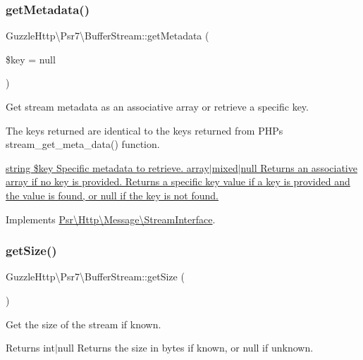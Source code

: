 \subsubsection{\texorpdfstring{get\+Metadata()}{getMetadata()}}
{\footnotesize\ttfamily Guzzle\+Http\textbackslash{}\+Psr7\textbackslash{}\+Buffer\+Stream\+::get\+Metadata (\begin{DoxyParamCaption}\item[{}]{\$key = {\ttfamily null} }\end{DoxyParamCaption})}

Get stream metadata as an associative array or retrieve a specific key.

The keys returned are identical to the keys returned from P\+HP\textquotesingle{}s stream\+\_\+get\+\_\+meta\+\_\+data() function.

\hyperlink{}{string \$key Specific metadata to retrieve.  array$\vert$mixed$\vert$null Returns an associative array if no key is provided. Returns a specific key value if a key is provided and the value is found, or null if the key is not found. }

Implements \hyperlink{interfacePsr_1_1Http_1_1Message_1_1StreamInterface_ac5e77fbbc7ba4235a4041d966f3aaa84}{Psr\textbackslash{}\+Http\textbackslash{}\+Message\textbackslash{}\+Stream\+Interface}.

\mbox{\label{classGuzzleHttp_1_1Psr7_1_1BufferStream_aad0e12c170462a9389ef6c5f95c71480}} 
\subsubsection{\texorpdfstring{get\+Size()}{getSize()}}
{\footnotesize\ttfamily Guzzle\+Http\textbackslash{}\+Psr7\textbackslash{}\+Buffer\+Stream\+::get\+Size (\begin{DoxyParamCaption}{ }\end{DoxyParamCaption})}

Get the size of the stream if known.

\begin{DoxyReturn}{Returns}
int$\vert$null Returns the size in bytes if known, or null if unknown. 
\end{DoxyReturn}


